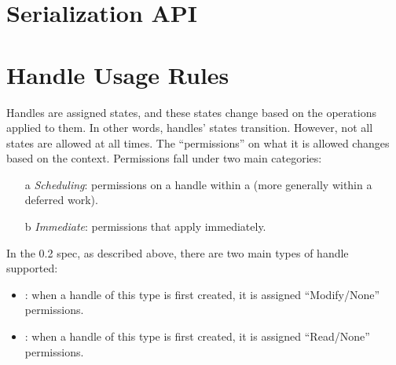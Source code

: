 

\section{Serialization API}










\section{Handle Usage Rules}
\label{sec:handlerules}

Handles are assigned states, and these states change 
based on the operations applied to them. In other words, 
handles' states transition. However, not all states 
are allowed at all times. The ``permissions'' on 
what it is allowed changes based on the context. 
Permissions fall under two main categories: 
\begin{itemize}
\item[a] {\it Scheduling}: permissions on a handle 
within a  (more generally within a deferred work).
\item[b] {\it Immediate}: permissions that apply immediately.
\end{itemize}

In the 0.2 spec, as described above, there are two main types 
of handle supported:
\begin{itemize}
\item {}: when a handle of 
this type is first created, it is assigned 
``Modify/None'' permissions.
%
\item {}: when a handle of 
this type is first created, it is assigned 
``Read/None'' permissions.
\end{itemize}



